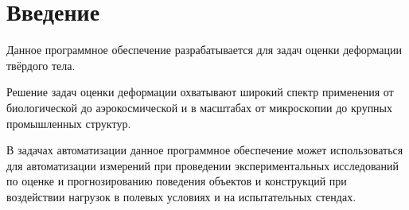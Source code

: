 \setcounter{figure}{0}
\newpage
\section*{Введение}
Данное программное обеспечение разрабатывается для задач оценки деформации твёрдого тела.

Решение задач оценки деформации охватывают широкий спектр применения от биологической до аэрокосмической и в масштабах от микроскопии до крупных промышленных структур.

В задачах автоматизации данное программное обеспечение может использоваться для автоматизации измерений при проведении экспериментальных исследований по оценке и прогнозированию поведения объектов и конструкций при воздействии нагрузок в полевых условиях и на испытательных стендах.

